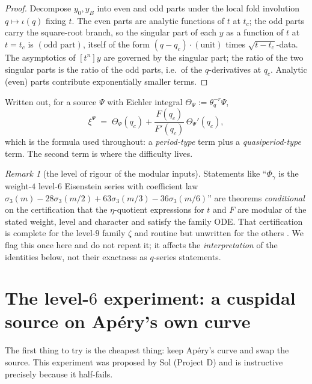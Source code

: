 \documentclass[11pt,reqno]{amsart}
\theoremstyle{plain}
\theoremstyle{definition}
\theoremstyle{remark}
\newtheorem{remark}[theorem]{Remark}
\newcommand{\thq}{\theta_q}
\begin{document}
\begin{proof}
Decompose $y_0,y_B$ into even and odd parts under the local fold
involution $q\mapsto\iota(q)$ fixing $t$. The even parts are analytic
functions of $t$ at $t_c$; the odd parts carry the square-root branch, so
the singular part of each $y$ as a function of $t$ at $t=t_c$ is
$(\text{odd part})$, itself of the form $(q-q_c)\cdot(\text{unit})$ times
$\sqrt{t-t_c}$-data. The asymptotics of $[t^n]y$ are governed by the
singular part; the ratio of the two singular parts is the ratio of the odd
parts, i.e.\ of the $q$-derivatives at $q_c$. Analytic (even) parts
contribute exponentially smaller terms.
\end{proof}

Written out, for a source $\Psi$ with Eichler integral
$\Theta_\Psi:=\thq^{-r}\Psi$,
\begin{equation}\label{eq:xi}
\xi^\Psi\;=\;\Theta_\Psi(q_c)+\frac{F(q_c)}{F'(q_c)}\,\Theta_\Psi'(q_c),
\end{equation}
which is the formula used throughout: a \emph{period-type} term plus a
\emph{quasiperiod-type} term. The second term is where the difficulty
lives.

\begin{remark}[the level of rigour of the modular inputs]
Statements like ``$\Phi_\gamma$ is the weight-$4$ level-$6$ Eisenstein
series with coefficient law $\sigma_3(m)-28\sigma_3(m/2)+63\sigma_3(m/3)
-36\sigma_3(m/6)$'' are theorems \emph{conditional} on the certification
that the $\eta$-quotient expressions for $t$ and $F$ are modular of the
stated weight, level and character and satisfy the family ODE. That
certification is complete for the level-$9$ family $\zeta$ and routine but
unwritten for the others \cite{philedger}. We flag this once here and do
not repeat it; it affects the \emph{interpretation} of the identities
below, not their exactness as $q$-series statements.
\end{remark}

\section{The level-$6$ experiment: a cuspidal source on Ap\'ery's own curve}
\label{sec:level6}

The first thing to try is the cheapest thing: keep Ap\'ery's curve and swap
the source. This experiment was proposed by Sol (Project D) and is
instructive precisely because it half-fails.
\end{document}
